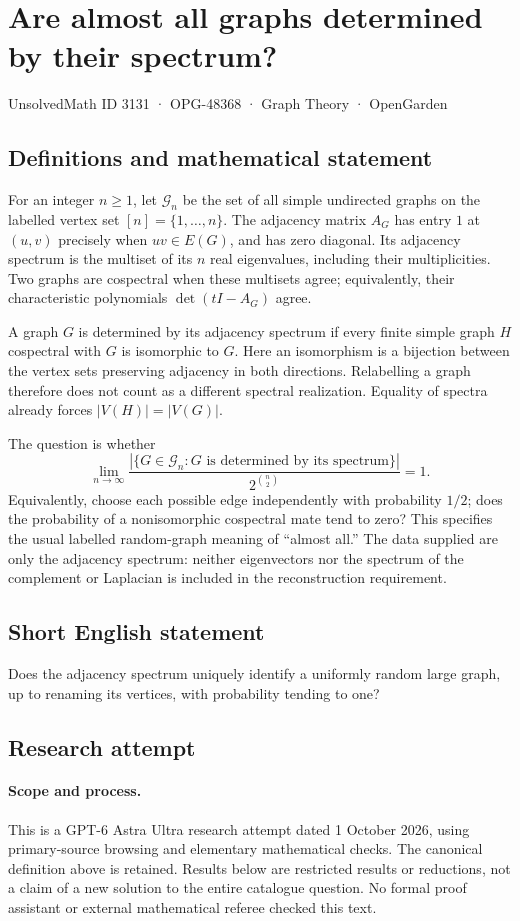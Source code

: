 \documentclass[11pt,a4paper]{article}
\begin{document}
\section*{Are almost all graphs determined by their spectrum?}\label{3131}
{\small UnsolvedMath ID 3131 · OPG-48368 · Graph Theory · OpenGarden}
\subsection{Definitions and mathematical statement}
For an integer $n\geq1$, let $\mathcal G_n$ be the set of all simple
undirected graphs on the labelled vertex set $[n]=\{1,\ldots,n\}$.
The adjacency matrix $A_G$ has entry $1$ at $(u,v)$ precisely when
$uv\in E(G)$, and has zero diagonal. Its adjacency spectrum is the
multiset of its $n$ real eigenvalues, including their multiplicities.
Two graphs are cospectral when these multisets agree; equivalently,
their characteristic polynomials $\det(tI-A_G)$ agree.

A graph $G$ is determined by its adjacency spectrum if every finite
simple graph $H$ cospectral with $G$ is isomorphic to $G$. Here an
isomorphism is a bijection between the vertex sets preserving adjacency
in both directions. Relabelling a graph therefore does not count as a
different spectral realization. Equality of spectra already forces
$|V(H)|=|V(G)|$.

The question is whether
\[
 \lim_{n\to\infty}
 \frac{|\{G\in\mathcal G_n:G\text{ is determined by its spectrum}\}|}
 {2^{\binom n2}}=1.
\]
Equivalently, choose each possible edge independently with probability
$1/2$; does the probability of a nonisomorphic cospectral mate tend to
zero? This specifies the usual labelled random-graph meaning of
``almost all.'' The data supplied are only the adjacency spectrum:
neither eigenvectors nor the spectrum of the complement or Laplacian
is included in the reconstruction requirement.
\subsection{Short English statement}
Does the adjacency spectrum uniquely identify a uniformly random large graph, up to renaming its vertices, with probability tending to one?
\subsection{Research attempt}
\paragraph{Scope and process.}
This is a GPT-6 Astra Ultra research attempt dated 1 October 2026, using
primary-source browsing and elementary mathematical checks. The canonical
definition above is retained. Results below are restricted results or
reductions, not a claim of a new solution to the entire catalogue question.
No formal proof assistant or external mathematical referee checked this text.
\end{document}
